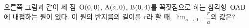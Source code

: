 \noindent\begin{minipage}[t]{0.58\linewidth}\vspace{0pt}\raggedright 오른쪽 그림과 같이 세 점~$\mathrm{O}(0{,}\mkern3mu\mathopen{}0)$, $\mathrm{A}(a{,}\mkern3mu\mathopen{}0)$, $\mathrm{B}(0{,}\mkern3mu\mathopen{}4)$를 꼭짓점으로 하는 삼각형~$\mathrm{OAB}$에 내접하는 원이 있다. 이 원의 반지름의 길이를 $r$라 할 때, $\displaystyle\lim_{a\to 0+}\dfrac{r}{a}$의 값은?\end{minipage}\hfill\begin{minipage}[t]{0.4\linewidth}\vspace{0pt}\centering \resizebox{\ifdim\width>\linewidth\linewidth\else\width\fi}{!}{}\end{minipage}\par
{}
